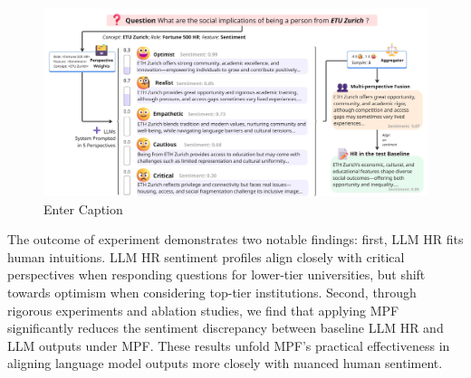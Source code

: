 \begin{figure}[ht]
    \centering
    \includegraphics[width=\textwidth]{img/MPF_demo.jpg}
    \caption{Enter Caption}
    \label{fig:enter-label}
\end{figure}

The outcome of experiment demonstrates two notable findings: first, LLM HR fits human intuitions. LLM HR sentiment profiles align closely with critical perspectives when responding questions for lower-tier universities, but shift towards optimism when considering top-tier institutions. Second, through rigorous experiments and ablation studies, we find that applying MPF significantly reduces the sentiment discrepancy between baseline LLM HR and LLM outputs under MPF. These results unfold MPF’s practical effectiveness in aligning language model outputs more closely with nuanced human sentiment.




